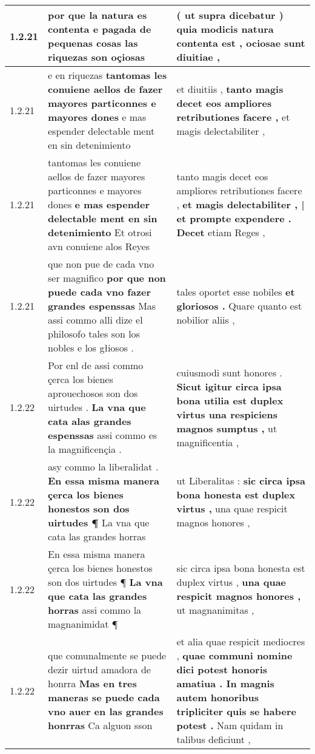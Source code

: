 \begin{tabular}{|p{1cm}|p{6.5cm}|p{6.5cm}|}
1.2.21 & por que la natura es contenta \textbf{ e pagada de pequenas cosas } las riquezas son oçiosas & ( \textbf{ ut supra dicebatur ) quia modicis natura contenta est , } ociosae sunt diuitiae , \\\hline
1.2.21 & e en riquezas \textbf{ tantomas les conuiene aellos de fazer mayores particonnes e mayores dones } e mas espender delectable ment en sin detenimiento & et diuitiis , \textbf{ tanto magis decet eos ampliores retributiones facere , } et magis delectabiliter , \\\hline
1.2.21 & tantomas les conuiene aellos de fazer mayores particonnes e mayores dones \textbf{ e mas espender delectable ment en sin detenimiento } Et otrosi avn conuiene alos Reyes & tanto magis decet eos ampliores retributiones facere , \textbf{ et magis delectabiliter , | et prompte expendere . Decet } etiam Reges , \\\hline
1.2.21 & que non pue de cada vno ser magnifico \textbf{ por que non puede cada vno fazer grandes espenssas } Mas assi commo alli dize el philosofo tales son los nobles e los głiosos . & tales oportet esse nobiles \textbf{ et gloriosos . } Quare quanto est nobilior aliis , \\\hline
1.2.22 & Por enl de assi commo çerca los bienes aprouechosos son dos uirtudes . \textbf{ La vna que cata alas grandes espenssas } assi commo es la magnificençia . & cuiusmodi sunt honores . \textbf{ Sicut igitur circa ipsa bona utilia est duplex virtus una respiciens magnos sumptus , } ut magnificentia , \\\hline
1.2.22 & asy commo la liberalidat . \textbf{ En essa misma manera çerca los bienes honestos son dos uirtudes ¶ } La vna que cata las grandes horras & ut Liberalitas : \textbf{ sic circa ipsa bona honesta est duplex virtus , } una quae respicit magnos honores , \\\hline
1.2.22 & En essa misma manera çerca los bienes honestos son dos uirtudes ¶ \textbf{ La vna que cata las grandes horras } assi commo la magnanimidat ¶ & sic circa ipsa bona honesta est duplex virtus , \textbf{ una quae respicit magnos honores , } ut magnanimitas , \\\hline
1.2.22 & que comunalmente se puede dezir uirtud amadora de honrra \textbf{ Mas en tres maneras se puede cada vno auer en las grandes honrras } Ca alguon sson & et alia quae respicit mediocres , \textbf{ quae communi nomine dici potest honoris amatiua . In magnis autem honoribus tripliciter quis se habere potest . } Nam quidam in talibus deficiunt , \\\hline

\end{tabular}
